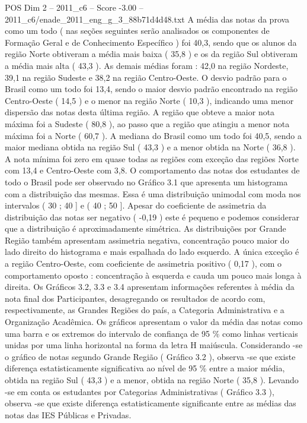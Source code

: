 \begin{textsample}{POS Dim 2 – 2011\_c6 – Score -3.00 – 2011\_c6/enade\_2011\_eng\_g\_3\_88b71d4d48.txt}
A média das notas da prova como um todo ( nas seções seguintes serão analisados os componentes de Formação Geral e de Conhecimento Específico ) foi 40,3, sendo que os alunos da região Norte obtiveram a média mais baixa ( 35,8 ) e os da região Sul obtiveram a média mais alta ( 43,3 ).
As demais médias foram : 42,0 na região Nordeste, 39,1 na região Sudeste e 38,2 na região Centro-Oeste.
O desvio padrão para o Brasil como um todo foi 13,4, sendo o maior desvio padrão encontrado na região Centro-Oeste ( 14,5 ) e o menor na região Norte ( 10,3 ), indicando uma menor dispersão das notas desta última região.
A região que obteve a maior nota máxima foi a Sudeste ( 80,8 ), ao passo que a região que atingiu a menor nota máxima foi a Norte ( 60,7 ).
A mediana do Brasil como um todo foi 40,5, sendo a maior mediana obtida na região Sul ( 43,3 ) e a menor obtida na Norte ( 36,8 ).
A nota mínima foi zero em quase todas as regiões com exceção das regiões Norte com 13,4 e Centro-Oeste com 3,8.
O comportamento das notas dos estudantes de todo o Brasil pode ser observado no Gráfico 3.1 que apresenta um histograma com a distribuição das mesmas.
Essa é uma distribuição unimodal com moda nos intervalos ( 30 ; 40 ] e ( 40 ; 50 ].
Apesar do coeficiente de assimetria da distribuição das notas ser negativo ( -0,19 ) este é pequeno e podemos considerar que a distribuição é aproximadamente simétrica.
As distribuições por Grande Região também apresentam assimetria negativa, concentração pouco maior do lado direito do histograma e mais espalhada do lado esquerdo.
A única exceção é a região Centro-Oeste, com coeficiente de assimetria positivo ( 0,17 ), com o comportamento oposto : concentração à esquerda e cauda um pouco mais longa à direita.
Os Gráficos 3.2, 3.3 e 3.4 apresentam informações referentes à média da nota final dos Participantes, desagregando os resultados de acordo com, respectivamente, as Grandes Regiões do país, a Categoria Administrativa e a Organização Acadêmica.
Os gráficos apresentam o valor da média das notas como uma barra e os extremos do intervalo de confiança de 95 \% como linhas verticais unidas por uma linha horizontal na forma da letra H maiúscula.
Considerando -se o gráfico de notas segundo Grande Região ( Gráfico 3.2 ), observa -se que existe diferença estatisticamente significativa ao nível de 95 \% entre a maior média, obtida na região Sul ( 43,3 ) e a menor, obtida na região Norte ( 35,8 ).
Levando -se em conta os estudantes por Categorias Administrativas ( Gráfico 3.3 ), observa -se que existe diferença estatisticamente significante entre as médias das notas das IES Públicas e Privadas.

\end{textsample}
